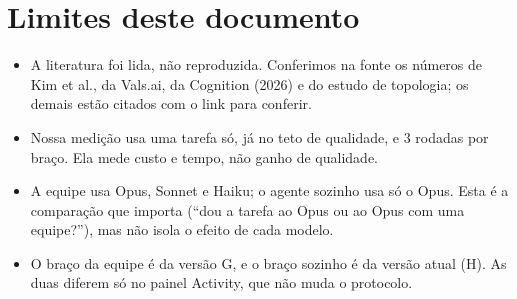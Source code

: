 \documentclass[11pt,a4paper]{article}
\begin{document}
\section{Limites deste documento}

\begin{itemize}
  \item A literatura foi lida, não reproduzida. Conferimos na fonte os números de Kim et al., da
    Vals.ai, da Cognition (2026) e do estudo de topologia; os demais estão citados com o link para
    conferir.
  \item Nossa medição usa uma tarefa só, já no teto de qualidade, e 3 rodadas por braço. Ela mede custo
    e tempo, não ganho de qualidade.
  \item A equipe usa Opus, Sonnet e Haiku; o agente sozinho usa só o Opus. Esta é a comparação que
    importa (``dou a tarefa ao Opus ou ao Opus com uma equipe?''), mas não isola o efeito de cada
    modelo.
  \item O braço da equipe é da versão G, e o braço sozinho é da versão atual (H). As duas diferem só
    no painel Activity, que não muda o protocolo.
\end{itemize}
\end{document}

